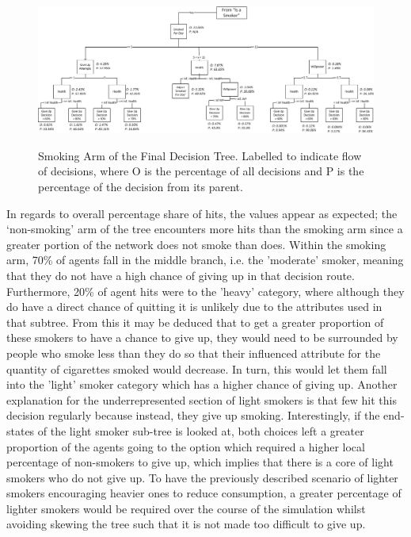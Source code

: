 \documentclass[]{report}
\begin{document}
\begin{landscape}
\begin{figure}
\begin{center}
\includegraphics[width=\paperwidth,keepaspectratio]{dectree-left-label.png}
\label{img:dectree-left-lab}
\caption{Smoking Arm of the Final Decision Tree. Labelled to indicate flow of decisions, where O is the percentage of all decisions and P is the percentage of the decision from its parent.}
\end{center}
\end{figure}
\end{landscape}

In regards to overall percentage share of hits, the values appear as expected; the `non-smoking' arm of the tree encounters more hits than the smoking arm since a greater portion of the network does not smoke than does. Within the smoking arm, 70\% of agents fall in the middle branch, i.e. the 'moderate' smoker, meaning that they do not have a high chance of giving up in that decision route. Furthermore, 20\% of agent hits were to the 'heavy' category, where although they do have a direct chance of quitting it is unlikely due to the attributes used in that subtree. From this it may be deduced that to get a greater proportion of these smokers to have a chance to give up, they would need to be surrounded by people who smoke less than they do so that their influenced attribute for the quantity of cigarettes smoked would decrease. In turn, this would let them fall into the 'light' smoker category which has a higher chance of giving up. Another explanation for the underrepresented section of light smokers is that few hit this decision regularly because instead, they give up smoking. Interestingly, if the end-states of the light smoker sub-tree is looked at, both choices left a greater proportion of the agents going to the option which required a higher local percentage of non-smokers to give up, which implies that there is a core of light smokers who do not give up. To have the previously described scenario of lighter smokers encouraging heavier ones to reduce consumption, a greater percentage of lighter smokers would be required over the course of the simulation whilst avoiding skewing the tree such that it is not made too difficult to give up.
\end{document}
